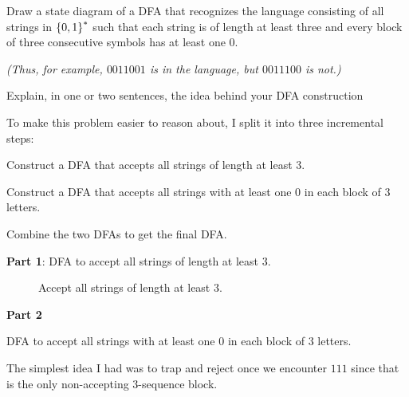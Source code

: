 \begin{problem}
Draw a state diagram of a DFA that recognizes the language consisting of all strings
in $\left\{0, 1\right\}^*$ such that each string is of length at least three
and every block of three consecutive symbols has at least one $0$.

\noindent
\emph{(Thus, for example, $0011001$ is in the language, but $0011100$ is not.)}

\step
Explain, in one or two sentences, the idea behind your DFA construction
\end{problem}

\begin{Answer}
  To make this problem easier to reason about,
  I split it into three incremental steps:
  \begin{enumroman}
    \item Construct a DFA that accepts all strings of length at least $3$.
    \item Construct a DFA that accepts all strings with at least one $0$ in each block of $3$ letters.
    \item Combine the two DFAs to get the final DFA.
  \end{enumroman}

  \step
  \textbf{Part 1}: DFA to accept all strings of length at least $3$.

  \begin{figure}[H]
    \centering
    \caption{Accept all strings of length at least $3$.}
    \label{fig:at-least-3}
  \end{figure}

  \newpage
  \step
  \textbf{Part 2}

  \step DFA to accept all strings with at least one $0$ in each block of $3$ letters.

  \step
  The simplest idea I had was to trap and reject once we encounter
   $111$ since that is the only non-accepting $3$-sequence block.


\end{Answer}
